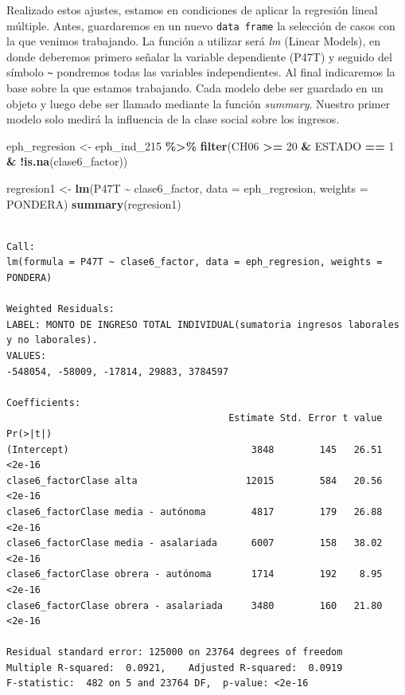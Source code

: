 \documentclass[
]{article}
\newenvironment{Shaded}{\begin{snugshade}}{\end{snugshade}}
\newcommand{\AttributeTok}[1]{\textcolor[rgb]{0.13,0.29,0.53}{#1}}
\newcommand{\DecValTok}[1]{\textcolor[rgb]{0.00,0.00,0.81}{#1}}
\newcommand{\FunctionTok}[1]{\textcolor[rgb]{0.13,0.29,0.53}{\textbf{#1}}}
\newcommand{\NormalTok}[1]{#1}
\newcommand{\OtherTok}[1]{\textcolor[rgb]{0.56,0.35,0.01}{#1}}
\newcommand{\SpecialCharTok}[1]{\textcolor[rgb]{0.81,0.36,0.00}{\textbf{#1}}}
\begin{document}
Realizado estos ajustes, estamos en condiciones de aplicar la regresión lineal múltiple. Antes, guardaremos en un nuevo \texttt{data\ frame} la selección de casos con la que venimos trabajando. La función a utilizar será \emph{lm} (Linear Models), en donde deberemos primero señalar la variable dependiente (P47T) y seguido del símbolo \texttt{\textasciitilde{}} pondremos todas las variables independientes. Al final indicaremos la base sobre la que estamos trabajando. Cada modelo debe ser guardado en un objeto y luego debe ser llamado mediante la función \emph{summary}. Nuestro primer modelo solo medirá la influencia de la clase social sobre los ingresos.

\begin{Shaded}
\begin{Highlighting}[]
\NormalTok{eph\_regresion }\OtherTok{\textless{}{-}}\NormalTok{ eph\_ind\_215 }\SpecialCharTok{\%\textgreater{}\%}
    \FunctionTok{filter}\NormalTok{(CH06 }\SpecialCharTok{\textgreater{}=} \DecValTok{20} \SpecialCharTok{\&}\NormalTok{ ESTADO }\SpecialCharTok{==} \DecValTok{1} \SpecialCharTok{\&} \SpecialCharTok{!}\FunctionTok{is.na}\NormalTok{(clase6\_factor))}

\NormalTok{regresion1 }\OtherTok{\textless{}{-}} \FunctionTok{lm}\NormalTok{(P47T }\SpecialCharTok{\textasciitilde{}}\NormalTok{ clase6\_factor, }\AttributeTok{data =}\NormalTok{ eph\_regresion, }\AttributeTok{weights =}\NormalTok{ PONDERA)}
\FunctionTok{summary}\NormalTok{(regresion1)}
\end{Highlighting}
\end{Shaded}

\begin{verbatim}

Call:
lm(formula = P47T ~ clase6_factor, data = eph_regresion, weights = PONDERA)

Weighted Residuals:
LABEL: MONTO DE INGRESO TOTAL INDIVIDUAL(sumatoria ingresos laborales y no laborales). 
VALUES:
-548054, -58009, -17814, 29883, 3784597

Coefficients:
                                       Estimate Std. Error t value Pr(>|t|)
(Intercept)                                3848        145   26.51   <2e-16
clase6_factorClase alta                   12015        584   20.56   <2e-16
clase6_factorClase media - autónoma        4817        179   26.88   <2e-16
clase6_factorClase media - asalariada      6007        158   38.02   <2e-16
clase6_factorClase obrera - autónoma       1714        192    8.95   <2e-16
clase6_factorClase obrera - asalariada     3480        160   21.80   <2e-16

Residual standard error: 125000 on 23764 degrees of freedom
Multiple R-squared:  0.0921,    Adjusted R-squared:  0.0919 
F-statistic:  482 on 5 and 23764 DF,  p-value: <2e-16
\end{verbatim}
\end{document}
